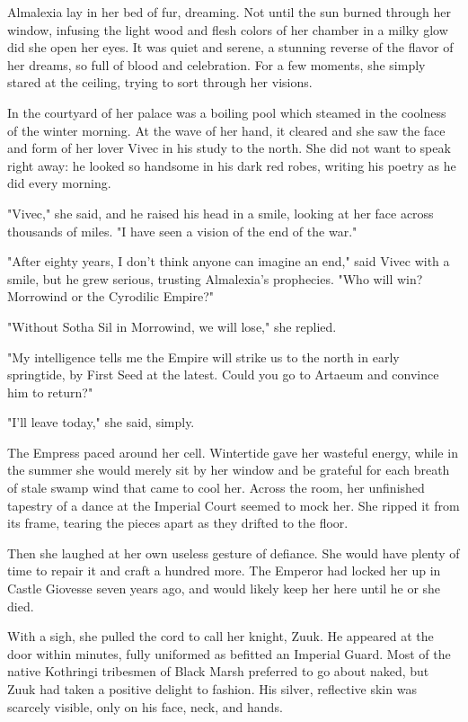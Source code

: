 
\dropcap Almalexia lay in her bed of fur, dreaming. Not until the sun burned through her window, infusing the light wood and flesh colors of her chamber in a milky glow did she open her eyes. It was quiet and serene, a stunning reverse of the flavor of her dreams, so full of blood and celebration. For a few moments, she simply stared at the ceiling, trying to sort through her visions.

In the courtyard of her palace was a boiling pool which steamed in the coolness of the winter morning. At the wave of her hand, it cleared and she saw the face and form of her lover Vivec in his study to the north. She did not want to speak right away: he looked so handsome in his dark red robes, writing his poetry as he did every morning.

"Vivec," she said, and he raised his head in a smile, looking at her face across thousands of miles. "I have seen a vision of the end of the war."

"After eighty years, I don't think anyone can imagine an end," said Vivec with a smile, but he grew serious, trusting Almalexia's prophecies. "Who will win? Morrowind or the Cyrodilic Empire?"

"Without Sotha Sil in Morrowind, we will lose," she replied.

"My intelligence tells me the Empire will strike us to the north in early springtide, by First Seed at the latest. Could you go to Artaeum and convince him to return?"

"I'll leave today," she said, simply.

The Empress paced around her cell. Wintertide gave her wasteful energy, while in the summer she would merely sit by her window and be grateful for each breath of stale swamp wind that came to cool her. Across the room, her unfinished tapestry of a dance at the Imperial Court seemed to mock her. She ripped it from its frame, tearing the pieces apart as they drifted to the floor.

Then she laughed at her own useless gesture of defiance. She would have plenty of time to repair it and craft a hundred more. The Emperor had locked her up in Castle Giovesse seven years ago, and would likely keep her here until he or she died.

With a sigh, she pulled the cord to call her knight, Zuuk. He appeared at the door within minutes, fully uniformed as befitted an Imperial Guard. Most of the native Kothringi tribesmen of Black Marsh preferred to go about naked, but Zuuk had taken a positive delight to fashion. His silver, reflective skin was scarcely visible, only on his face, neck, and hands.

